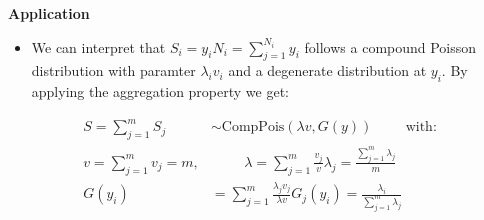 \documentclass{article}
\begin{document}
\noindent \textbf{Application}
\begin{itemize}
    \item We can interpret that $S_i = y_i N_i = \sum_{j=1}^{N_i}y_i$ follows a compound Poisson distribution with paramter $\lambda _i v_i$ and a degenerate distribution at $y_i$. By applying the aggregation property we get:
\end{itemize}
\begin{align*}
    S = \sum_{j=1}^m S_j &\sim \text{CompPois}(\lambda v, G(y)) \hspace{1cm} \text{with:} \\
    v = \sum_{j=1}^m v_j = m,& \hspace{1cm} \lambda = \sum_{j=1}^m \frac{v_j}{v}\lambda _j = \frac{\sum_{j=1}^m \lambda _j}{m}\\
    G(y_i) &= \sum_{j=1}^m \frac{\lambda_j v_j}{\lambda v} G_j(y_i) = \frac{\lambda_i}{\sum_{j=1}^m \lambda_j}
\end{align*}
\end{document}
